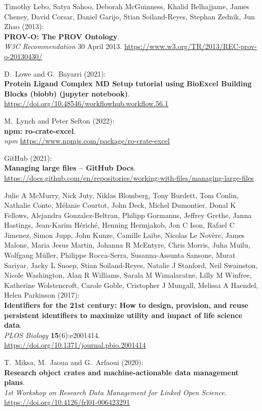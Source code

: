 Timothy Lebo, Satya Sahoo, Deborah McGuinness, Khalid Belhajjame, 
James Cheney, David Corsar, Daniel Garijo, Stian Soiland-Reyes, 
Stephan Zednik, Jun Zhao (2013):\\
\textbf{PROV-O: The PROV Ontology}.\\
\emph{W3C Recommendation} 30 April 2013.
\url{https://www.w3.org/TR/2013/REC-prov-o-20130430/}

D.~Lowe and G.~Bayarri (2021):\\
\textbf{Protein Ligand Complex MD Setup tutorial using BioExcel Building
Blocks (biobb) (jupyter notebook)}.\\
\url{https://doi.org/10.48546/workflowhub.workflow.56.1}

M.~Lynch and Peter Sefton (2022):\\
\textbf{npm: ro-crate-excel}.\\
\emph{npm} \url{https://www.npmjs.com/package/ro-crate-excel}

GitHub (2021):\\
\textbf{Managing large files -- GitHub Docs}.\\
\url{https://docs.github.com/en/repositories/working-with-files/managing-large-files}

Julie A McMurry, Nick Juty, Niklas Blomberg, Tony Burdett, Tom
Conlin, Nathalie Conte, Mélanie Courtot, John Deck, Michel Dumontier,
Donal K Fellows, Alejandra Gonzalez-Beltran, Philipp Gormanns, Jeffrey
Grethe, Janna Hastings, Jean-Karim Hériché, Henning Hermjakob, Jon C
Ison, Rafael C Jimenez, Simon Jupp, John Kunze, Camille Laibe, Nicolas
Le Novère, James Malone, Maria Jesus Martin, Johanna R McEntyre, Chris
Morris, Juha Muilu, Wolfgang Müller, Philippe Rocca-Serra,
Susanna-Assunta Sansone, Murat Sariyar, Jacky L Snoep, Stian
Soiland-Reyes, Natalie J Stanford, Neil Swainston, Nicole Washington,
Alan R Williams, Sarala M Wimalaratne, Lilly M Winfree, Katherine
Wolstencroft, Carole Goble, Cristopher J Mungall, Melissa A Haendel,
Helen Parkinson (2017):\\
\textbf{Identifiers for the 21st century: How to design, provision, and
reuse persistent identifiers to maximize utility and impact of life
science data}.\\
\emph{PLOS Biology} \textbf{15}(6):e2001414.\\
\url{https://doi.org/10.1371/journal.pbio.2001414}

T.~Miksa, M.~Jaoua and G.~Arfaoui (2020):\\
\textbf{Research object crates and machine-actionable data management
plans}.\\
\emph{1st Workshop on Research Data Management for Linked Open
Science}.\\
\url{https://doi.org/10.4126/frl01-006423291}

